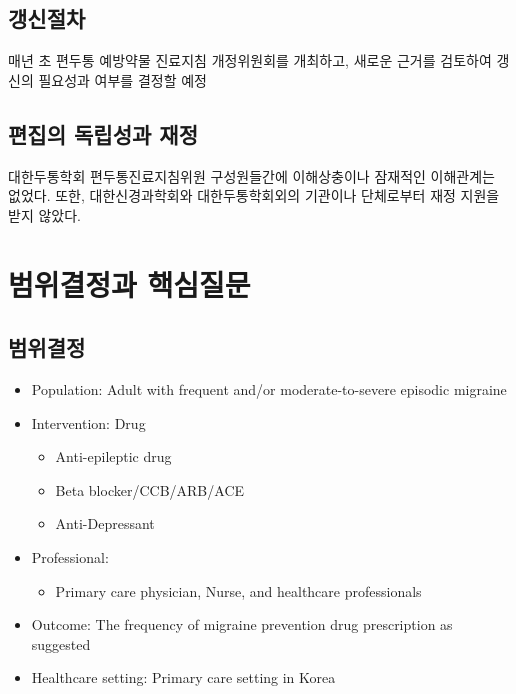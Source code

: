 \documentclass[]{book}
\providecommand{\tightlist}{%
  \setlength{\itemsep}{0pt}\setlength{\parskip}{0pt}}
\begin{document}
\hypertarget{section-45}{%
\section{갱신절차}\label{section-45}}

매년 초 편두통 예방약물 진료지침 개정위원회를 개최하고, 새로운 근거를 검토하여 갱신의 필요성과 여부를 결정할 예정

\hypertarget{section-46}{%
\section{편집의 독립성과 재정}\label{section-46}}

대한두통학회 편두통진료지침위원 구성원들간에 이해상충이나 잠재적인 이해관계는 없었다. 또한, 대한신경과학회와 대한두통학회외의 기관이나 단체로부터 재정 지원을 받지 않았다.

\hypertarget{section-47}{%
\chapter{범위결정과 핵심질문}\label{section-47}}

\hypertarget{section-48}{%
\section{범위결정}\label{section-48}}

\begin{itemize}
\item
  Population: Adult with frequent and/or moderate-to-severe episodic migraine
\item
  Intervention: Drug

  \begin{itemize}
  \tightlist
  \item
    Anti-epileptic drug
  \item
    Beta blocker/CCB/ARB/ACE
  \item
    Anti-Depressant
  \end{itemize}
\item
  Professional:

  \begin{itemize}
  \tightlist
  \item
    Primary care physician, Nurse, and healthcare professionals
  \end{itemize}
\item
  Outcome: The frequency of migraine prevention drug prescription as suggested
\item
  Healthcare setting: Primary care setting in Korea
\end{itemize}
\end{document}
